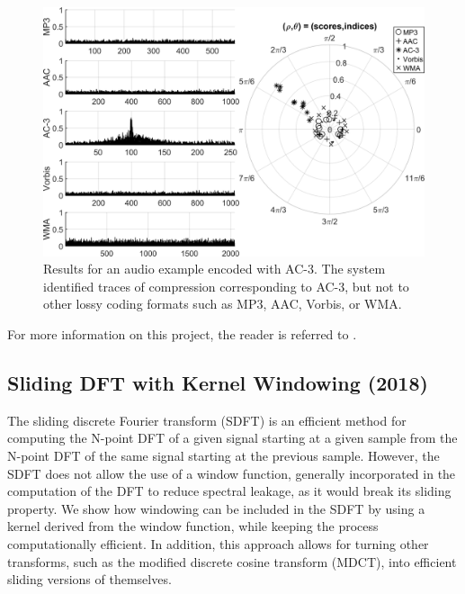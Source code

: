 \documentclass{article}
\begin{document}
\begin{figure}[!htb]
\centering
\includegraphics[width=\columnwidth]{Images/compression.png}
\caption{Results for an audio example encoded with AC-3. The system identified traces of compression corresponding to AC-3, but not to other lossy coding formats such as MP3, AAC, Vorbis, or WMA.}
\label{fig:compression}
\end{figure}

For more information on this project, the reader is referred to \cite{inproceedings_kim_sep2018}.


\subsection{Sliding DFT with Kernel Windowing (2018)}
\label{ssec:sdft}

The sliding discrete Fourier transform (SDFT) is an efficient method for computing the N-point DFT of a given signal starting at a given sample from the N-point DFT of the same signal starting at the previous sample. However, the SDFT does not allow the use of a window function, generally incorporated in the computation of the DFT to reduce spectral leakage, as it would break its sliding property. We show how windowing can be included in the SDFT by using a kernel derived from the window function, while keeping the process computationally efficient. In addition, this approach allows for turning other transforms, such as the modified discrete cosine transform (MDCT), into efficient sliding versions of themselves.
\end{document}
